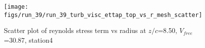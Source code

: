 \begin{figure}[H]
\centering
\texttt{[image: figs/run\_39/run\_39\_turb\_visc\_ettap\_top\_vs\_r\_mesh\_scatter]}
\caption{Scatter plot of reynolds stress term vs radius at $z/c$=8.50, $V_{free}$=30.87, station4}
\label{fig:run_39_turb_visc_ettap_top_vs_r_mesh_scatter}
\end{figure}


